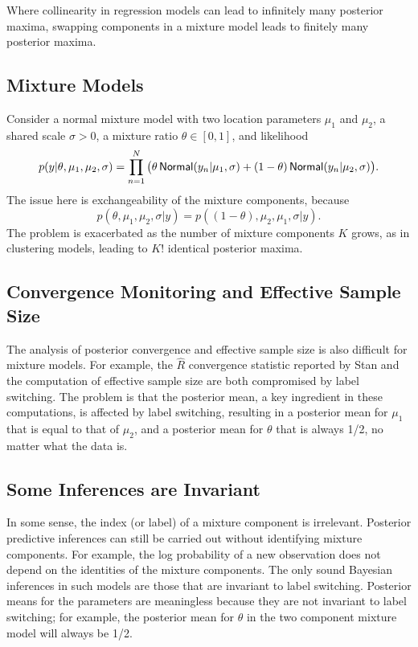 Where collinearity in regression models can lead to infinitely many
posterior maxima, swapping components in a mixture model leads to
finitely many posterior maxima.

\subsection{Mixture Models}

Consider a normal mixture model with two location parameters $\mu_1$
and $\mu_2$, a shared scale $\sigma > 0$, a mixture ratio $\theta \in
[0,1]$, and likelihood
\[
p(y|\theta,\mu_1,\mu_2,\sigma) 
= \prod_{n=1}^N \big( \theta \, \distro{Normal}(y_n|\mu_1,\sigma)
                       + (1 - \theta) \, \distro{Normal}(y_n|\mu_2,\sigma) \big).
\]
The issue here is exchangeability of the mixture components, because
\[
p(\theta,\mu_1,\mu_2,\sigma|y) = p((1-\theta),\mu_2,\mu_1,\sigma|y).
\]
The problem is exacerbated as the number of mixture components $K$
grows, as in clustering models, leading to $K!$ identical posterior
maxima.

\subsection{Convergence Monitoring and Effective Sample Size}

The analysis of posterior convergence and effective sample size is
also difficult for mixture models.  For example, the $\hat{R}$
convergence statistic reported by Stan and the computation of
effective sample size are both compromised by label switching.  The
problem is that the posterior mean, a key ingredient in these
computations, is affected by label switching, resulting in a posterior
mean for $\mu_1$ that is equal to that of $\mu_2$, and a posterior
mean for $\theta$ that is always 1/2, no matter what the data is. 

\subsection{Some Inferences are Invariant}

In some sense, the index (or label) of a mixture component is
irrelevant.  Posterior predictive inferences can still be carried out
without identifying mixture components.  For example, the log
probability of a new observation does not depend on the identities of
the mixture components.  The only sound Bayesian inferences in such
models are those that are invariant to label switching.  Posterior
means for the parameters are meaningless because they are not
invariant to label switching; for example, the posterior mean for
$\theta$ in the two component mixture model will always be 1/2.

